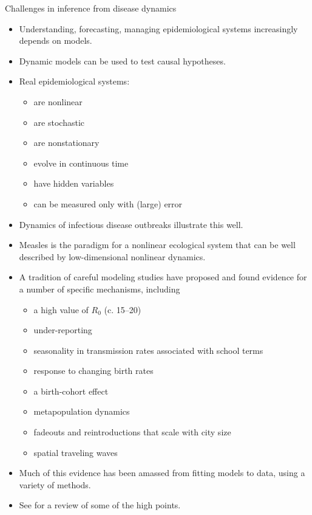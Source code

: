 \begin{frame}[fragile,allowframebreaks=0.8]{Challenges in inference from disease dynamics}
  \begin{itemize}
  \item Understanding, forecasting, managing epidemiological systems increasingly depends on models.
  \item Dynamic models can be used to test causal hypotheses.
  \item Real epidemiological systems:
    \begin{itemize}
    \item are nonlinear
    \item are stochastic
    \item are nonstationary
    \item evolve in continuous time
    \item have hidden variables
    \item can be measured only with (large) error
    \end{itemize}
  \item Dynamics of infectious disease outbreaks illustrate this well.
  \item Measles is the paradigm for a nonlinear ecological system that can be well described by low-dimensional nonlinear dynamics.
  \item A tradition of careful modeling studies have proposed and found evidence for a number of specific mechanisms, including
    \begin{itemize}
    \item a high value of $R_0$ (c. 15--20)
    \item under-reporting
    \item seasonality in transmission rates associated with school terms
    \item response to changing birth rates
    \item a birth-cohort effect
    \item metapopulation dynamics
    \item fadeouts and reintroductions that scale with city size
    \item spatial traveling waves
    \end{itemize}
  \item Much of this evidence has been amassed from fitting models to data, using a variety of methods.
  \item See \citet{Rohani2010} for a review of some of the high points.
  \end{itemize}


\end{frame}

